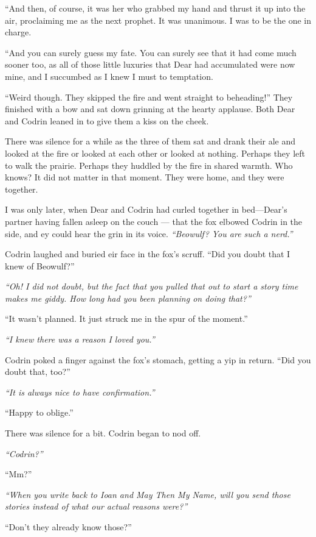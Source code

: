 ``And then, of course, it was her who grabbed my hand and thrust it up into the air, proclaiming me as the next prophet. It was unanimous. I was to be the one in charge.

``And you can surely guess my fate. You can surely see that it had come much sooner too, as all of those little luxuries that Dear had accumulated were now mine, and I succumbed as I knew I must to temptation.

``Weird though. They skipped the fire and went straight to beheading!'' They finished with a bow and sat down grinning at the hearty applause. Both Dear and Codrin leaned in to give them a kiss on the cheek.

There was silence for a while as the three of them sat and drank their ale and looked at the fire or looked at each other or looked at nothing. Perhaps they left to walk the prairie. Perhaps they huddled by the fire in shared warmth. Who knows? It did not matter in that moment. They were home, and they were together.

I was only later, when Dear and Codrin had curled together in bed---Dear's partner having fallen asleep on the couch — that the fox elbowed Codrin in the side, and ey could hear the grin in its voice. \emph{``Beowulf? You are such a nerd.''}

Codrin laughed and buried eir face in the fox's scruff. ``Did you doubt that I knew of Beowulf?''

\emph{``Oh! I did not doubt, but the fact that you pulled that out to start a story time makes me giddy. How long had you been planning on doing that?''}

``It wasn't planned. It just struck me in the spur of the moment.''

\emph{``I knew there was a reason I loved you.''}

Codrin poked a finger against the fox's stomach, getting a yip in return. ``Did you doubt that, too?''

\emph{``It is always nice to have confirmation.''}

``Happy to oblige.''

There was silence for a bit. Codrin began to nod off.

\emph{``Codrin?''}

``Mm?''

\emph{``When you write back to Ioan and May Then My Name, will you send those stories instead of what our actual reasons were?''}

``Don't they already know those?''

